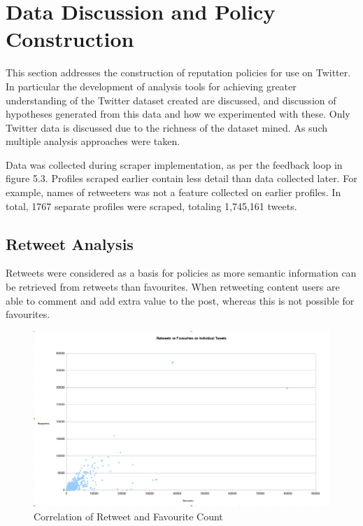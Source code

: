 \chapter{Data Discussion and Policy Construction}\label{C:us}

This section addresses the construction of reputation policies for use on Twitter. In particular the development of analysis tools for achieving greater understanding of the Twitter dataset created are discussed, and discussion of hypotheses generated from this data and how we experimented with these. Only Twitter data is discussed due to the richness of the dataset mined. As such multiple analysis approaches were taken.

Data was collected during scraper implementation, as per the feedback loop in figure 5.3. Profiles scraped earlier contain less detail than data collected later. For example, names of retweeters was not a feature collected on earlier profiles. In total, 1767 separate profiles were scraped, totaling 1,745,161 tweets. 

\section{Retweet Analysis}

Retweets were considered as a basis for policies as more semantic information can be retrieved from retweets than favourites. When retweeting content users are able to comment and add extra value to the post, whereas this is not possible for favourites.

\begin{figure}[ht]
\begin{center}
 \centering
\includegraphics[width=500px]{Images/retweets_vs_favourites.pdf}
\caption{Correlation of Retweet and Favourite Count}
\label{fig:correlation_retweet_fav}
\end{center}
\end{figure}

